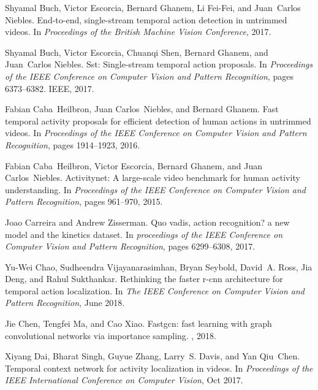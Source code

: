 \documentclass[10pt,twocolumn,letterpaper]{article}
\begin{document}
\begin{thebibliography}{10}\itemsep=-1pt
	
	Shyamal Buch, Victor Escorcia, Bernard Ghanem, Li Fei-Fei, and Juan~Carlos
	Niebles.
	\newblock End-to-end, single-stream temporal action detection in untrimmed
	videos.
	\newblock In {\em Proceedings of the British Machine Vision Conference}, 2017.
	
	Shyamal Buch, Victor Escorcia, Chuanqi Shen, Bernard Ghanem, and Juan~Carlos
	Niebles.
	\newblock Sst: Single-stream temporal action proposals.
	\newblock In {\em Proceedings of the IEEE Conference on Computer Vision and
		Pattern Recognition}, pages 6373--6382. IEEE, 2017.
	
	Fabian Caba~Heilbron, Juan Carlos~Niebles, and Bernard Ghanem.
	\newblock Fast temporal activity proposals for efficient detection of human
	actions in untrimmed videos.
	\newblock In {\em Proceedings of the IEEE Conference on Computer Vision and
		Pattern Recognition}, pages 1914--1923, 2016.
	
	Fabian Caba~Heilbron, Victor Escorcia, Bernard Ghanem, and Juan Carlos~Niebles.
	\newblock Activitynet: A large-scale video benchmark for human activity
	understanding.
	\newblock In {\em Proceedings of the IEEE Conference on Computer Vision and
		Pattern Recognition}, pages 961--970, 2015.
	
	Joao Carreira and Andrew Zisserman.
	\newblock Quo vadis, action recognition? a new model and the kinetics dataset.
	\newblock In {\em proceedings of the IEEE Conference on Computer Vision and
		Pattern Recognition}, pages 6299--6308, 2017.
	
	Yu-Wei Chao, Sudheendra Vijayanarasimhan, Bryan Seybold, David~A. Ross, Jia
	Deng, and Rahul Sukthankar.
	\newblock Rethinking the faster r-cnn architecture for temporal action
	localization.
	\newblock In {\em The IEEE Conference on Computer Vision and Pattern
		Recognition}, June 2018.
	
	Jie Chen, Tengfei Ma, and Cao Xiao.
	\newblock Fastgcn: fast learning with graph convolutional networks via
	importance sampling.
	, 2018.
	
	Xiyang Dai, Bharat Singh, Guyue Zhang, Larry~S. Davis, and Yan Qiu~Chen.
	\newblock Temporal context network for activity localization in videos.
	\newblock In {\em Proceedings of the IEEE International Conference on Computer
		Vision}, Oct 2017.
	

\end{thebibliography}
\end{document}
